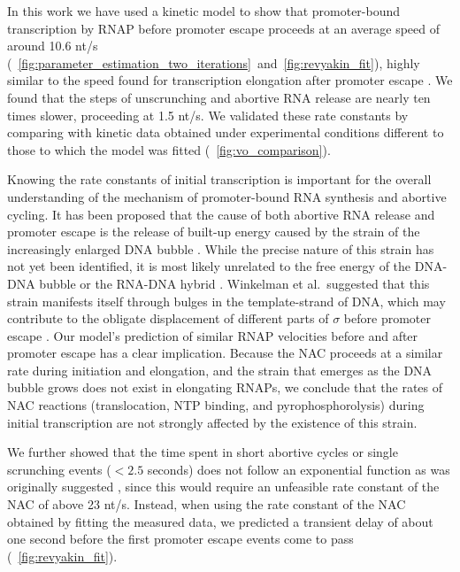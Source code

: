 %

In this work we have used a kinetic model to show that promoter-bound
transcription by RNAP before promoter escape proceeds at an average speed of
around 10.6 nt/s
(\FIGS~\ref{fig:parameter_estimation_two_iterations}~and~\ref{fig:revyakin_fit}), highly
similar to the speed found for transcription elongation after promoter escape
\cite{revyakin_abortive_2006}. We found that the steps of unscrunching and
abortive RNA release are nearly ten times slower, proceeding at 1.5 nt/s. We
validated these rate constants by comparing with kinetic data obtained under
experimental conditions different to those to which the model was fitted
(\FIG~\ref{fig:vo_comparison}).

Knowing the rate constants of initial transcription is important for the
overall understanding of the mechanism of promoter-bound RNA synthesis and
abortive cycling. It has been proposed that the cause of both abortive RNA
release and promoter escape is the release of built-up energy caused by the
strain of the increasingly enlarged DNA bubble \cite{straney_stressed_1987,
hsu_promoter_2002, revyakin_abortive_2006}. While the precise nature of this
strain has not yet been identified, it is most likely unrelated to the free
energy of the DNA-DNA bubble or the RNA-DNA hybrid \cite{hsu_initial_2006,
skancke_sequence-dependent_2015}. Winkelman et al.\ suggested that this strain
manifests itself through bulges in the template-strand of DNA, which may
contribute to the obligate displacement of different parts of $\sigma$ before
promoter escape \cite{winkelman_crosslink_2015}. Our model's prediction of
similar RNAP velocities before and after promoter escape has a clear
implication. Because the NAC proceeds at a similar rate during initiation and
elongation, and the strain that emerges as the DNA bubble grows does not exist
in elongating RNAPs, we conclude that the rates of NAC reactions
(translocation, NTP binding, and pyrophosphorolysis) during initial
transcription are not strongly affected by the existence of this strain.

We further showed that the time spent in short abortive cycles or single
scrunching events ($< 2.5$ seconds) does not follow an exponential function
as was originally suggested \cite{revyakin_abortive_2006}, since this would
require an unfeasible rate constant of the NAC of above 23 nt/s. Instead, when
using the rate constant of the NAC obtained by fitting the measured data, we
predicted a transient delay of about one second before the first promoter
escape events come to pass (\FIG~\ref{fig:revyakin_fit}).

